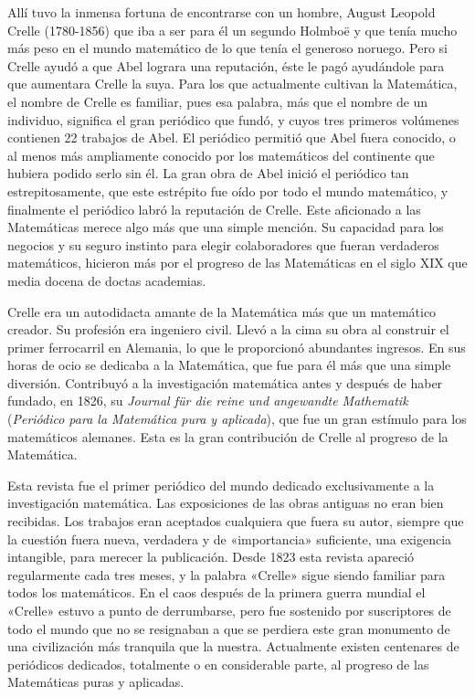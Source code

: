\documentclass[a4paper, 12pt, draft]{article}
\begin{document}
Allí tuvo la inmensa fortuna de encontrarse con un hombre, August Leopold Crelle (1780-1856) que iba a ser para él un segundo Holmboë y que tenía mucho más peso en el mundo matemático de lo que tenía el generoso noruego. Pero si Crelle ayudó a que Abel lograra una reputación, éste le pagó ayudándole para que aumentara Crelle la suya. Para los que actualmente cultivan la Matemática, el nombre de Crelle es familiar, pues esa palabra, más que el nombre de un individuo, significa el gran periódico que fundó, y cuyos tres primeros volúmenes contienen 22 trabajos de Abel. El periódico permitió que Abel fuera conocido, o al menos más ampliamente conocido por los matemáticos del continente que hubiera podido serlo sin él. La gran obra de Abel inició el periódico tan estrepitosamente, que este estrépito fue oído por todo el mundo matemático, y finalmente el periódico labró la reputación de Crelle. Este aficionado a las Matemáticas merece algo más que una simple mención. Su capacidad para los negocios y su seguro instinto para elegir colaboradores que fueran verdaderos matemáticos, hicieron más por el progreso de las Matemáticas en el siglo XIX que media docena de doctas academias.

Crelle era un autodidacta amante de la Matemática más que un matemático creador. Su profesión era ingeniero civil. Llevó a la cima su obra al construir el primer ferrocarril en Alemania, lo que le proporcionó abundantes ingresos. En sus horas de ocio se dedicaba a la Matemática, que fue para él más que una simple diversión. Contribuyó a la investigación matemática antes y después de haber fundado, en 1826, su {\it Journal für die reine und angewandte Mathematik} ({\it Periódico para la Matemática pura y aplicada}), que fue un gran estímulo para los matemáticos alemanes. Esta es la gran contribución de Crelle al progreso de la Matemática.

Esta revista fue el primer periódico del mundo dedicado exclusivamente a la investigación matemática. Las exposiciones de las obras antiguas no eran bien recibidas. Los trabajos eran aceptados cualquiera que  fuera su autor, siempre que la cuestión fuera nueva, verdadera y de «importancia» suficiente, una exigencia intangible, para merecer la publicación. Desde 1823 esta revista apareció regularmente cada tres meses, y la palabra «Crelle» sigue siendo familiar para todos los matemáticos. En el caos después de la primera guerra mundial el «Crelle» estuvo a punto de derrumbarse, pero fue sostenido por suscriptores de todo el mundo que no se resignaban a que se perdiera este gran monumento de una civilización más tranquila que la nuestra. Actualmente existen centenares de periódicos dedicados, totalmente o en considerable parte, al progreso de las Matemáticas puras y aplicadas.
\end{document}
